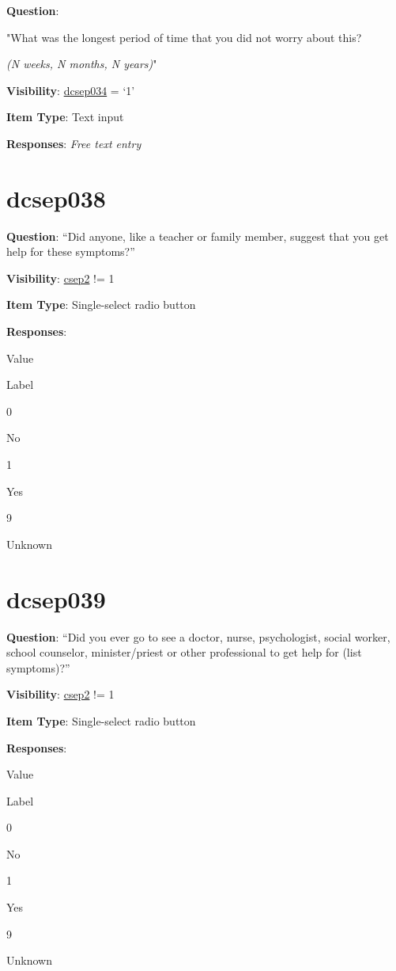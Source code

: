 \documentclass[]{book}
\begin{document}
\textbf{Question}:

"What was the longest period of time that you did not worry about this?

\emph{(N weeks, N months, N years)}"

\textbf{Visibility}: \protect\hyperlink{dcsep034}{dcsep034} = `1'

\textbf{Item Type}: Text input

\textbf{Responses}: \emph{Free text entry}

\hypertarget{dcsep038}{%
\section{dcsep038}\label{dcsep038}}

\textbf{Question}: ``Did anyone, like a teacher or family member, suggest that you get help for these symptoms?''

\textbf{Visibility}: \protect\hyperlink{csep2}{csep2} != 1

\textbf{Item Type}: Single-select radio button

\textbf{Responses}:

Value

Label

0

No

1

Yes

9

Unknown

\hypertarget{dcsep039}{%
\section{dcsep039}\label{dcsep039}}

\textbf{Question}: ``Did you ever go to see a doctor, nurse, psychologist, social worker, school counselor, minister/priest or other professional to get help for (list symptoms)?''

\textbf{Visibility}: \protect\hyperlink{csep2}{csep2} != 1

\textbf{Item Type}: Single-select radio button

\textbf{Responses}:

Value

Label

0

No

1

Yes

9

Unknown
\end{document}
